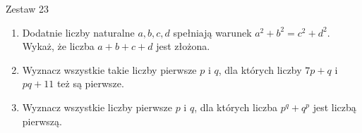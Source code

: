 \documentclass[10pt]{article}
\begin{document}
Zestaw 23

\begin{enumerate}
  \item Dodatnie liczby naturalne \(a, b, c, d\) spełniają warunek \(a^{2}+b^{2}=c^{2}+d^{2}\). Wykaż, że liczba \(a+b+c+d\) jest złożona.
  \item Wyznacz wszystkie takie liczby pierwsze \(p\) i \(q\), dla których liczby \(7 p+q\) i \(p q+11\) też są pierwsze.
  \item Wyznacz wszystkie liczby pierwsze \(p\) i \(q\), dla których liczba \(p^{q}+q^{p}\) jest liczbą pierwszą.
\end{enumerate}
\end{document}
